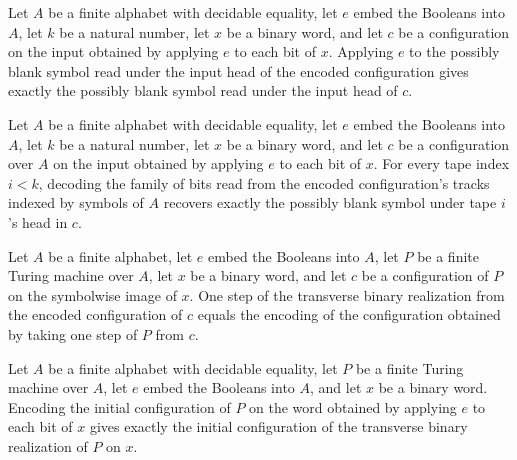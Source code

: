 \begin{lemma}
\label{Complexity.parallelCfg_input}
\leanok
{}
Let $A$ be a finite alphabet with decidable equality, let $e$ embed the Booleans into
$A$, let $k$ be a natural number, let $x$ be a binary word, and let $c$ be a
configuration on the input obtained by applying $e$ to each bit of $x$. Applying $e$ to
the possibly blank symbol read under the input head of the encoded configuration gives
exactly the possibly blank symbol read under the input head of $c$.
\end{lemma}

\begin{lemma}
\label{Complexity.parallelCfg_read}
\leanok
{}
Let $A$ be a finite alphabet with decidable equality, let $e$ embed the Booleans into
$A$, let $k$ be a natural number, let $x$ be a binary word, and let $c$ be a
configuration over $A$ on the input obtained by applying $e$ to each bit of $x$. For
every tape index $i<k$, decoding the family of bits read from the encoded
configuration's tracks indexed by symbols of $A$ recovers exactly the possibly blank
symbol under tape $i$'s head in $c$.
\end{lemma}

\begin{lemma}
\label{Complexity.parallelTM_step}
\leanok
{}
Let $A$ be a finite alphabet, let $e$ embed the Booleans into $A$, let $P$ be a finite
Turing machine over $A$, let $x$ be a binary word, and let $c$ be a configuration of $P$
on the symbolwise image of $x$. One step of the transverse binary realization from the
encoded configuration of $c$ equals the encoding of the configuration obtained by taking
one step of $P$ from $c$.
\end{lemma}

\begin{lemma}
\label{Complexity.parallelCfg_init}
\leanok
{}
Let $A$ be a finite alphabet with decidable equality, let $P$ be a finite Turing machine
over $A$, let $e$ embed the Booleans into $A$, and let $x$ be a binary word. Encoding
the initial configuration of $P$ on the word obtained by applying $e$ to each bit of $x$
gives exactly the initial configuration of the transverse binary realization of $P$ on
$x$.
\end{lemma}


